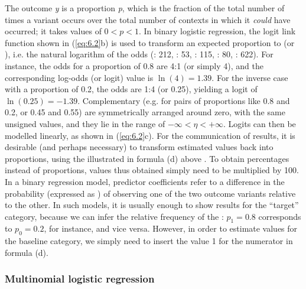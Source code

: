 The outcome \textit{y} is a proportion \textit{p}, which is the fraction of the total number of times a variant occurs over the total number of contexts in which it \textit{could} have occurred; it takes values of $0<p<1$. In binary logistic regression, the logit link function shown in (\ref{eq:6.2}b) is used to transform an expected proportion to  (or ), i.e. the natural logarithm of the odds (\citealt{SnijdersBosker1999}: 212, \citealt{Luke2004}: 53, \citealt{Agresti2013}: 115, \citealt{GelmanHill2007}: 80, \citealt{Kruschke2015}: 622). For instance, the odds for a proportion of 0.8 are 4:1 (or simply 4), and the corresponding log-odds (or logit) value is $\ln(4)=1.39$. For the inverse case with a proportion of 0.2, the odds are 1:4 (or 0.25), yielding a logit of $\ln(0.25)=-1.39$. Complementary  (e.g. for pairs of proportions like 0.8 and 0.2, or 0.45 and 0.55) are symmetrically arranged around zero, with the same unsigned values, and they lie in the range of $-\infty < \eta < +\infty$. Logits can then be modelled linearly, as shown in (\ref{eq:6.2}c). For the communication of results, it is desirable (and perhaps necessary) to transform estimated values back into proportions, using the  illustrated in formula (d) above \citep[56]{Luke2004}. To obtain percentages instead of proportions, values thus obtained simply need to be multiplied by 100. In a binary regression model, predictor coefficients refer to a difference in the probability (expressed as ) of observing one of the two outcome variants relative to the other. In such models, it is usually enough to show results for the “target” category, because we can infer the relative frequency of the : $p_1=0.8$ corresponds to $p_0=0.2$, for instance, and vice versa. However, in order to estimate values for the baseline category, we simply need to insert the value 1 for the numerator in formula (d).

\subsubsection{Multinomial logistic regression}\label{sec:6.3.3.3}


